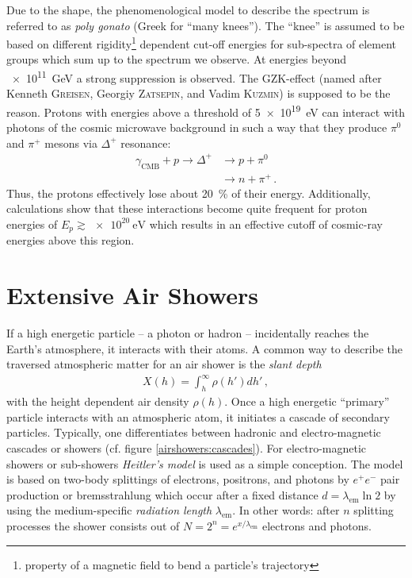 Due to the shape, the phenomenological model to describe the spectrum is referred to as \textit{poly gonato} (Greek for \enquote{many knees}). The \enquote{knee} is assumed to be based on different rigidity\footnote{property of a magnetic field to bend a particle's trajectory} dependent cut-off energies for sub-spectra of element groups which sum up to the spectrum we observe. \cite{cosmicrays:hoerandel, cosmicrays:shapiro} At energies beyond \SI{e11}{\giga\electronvolt} a strong suppression is observed. The GZK-effect (named after Kenneth \textsc{Greisen}, Georgiy \textsc{Zatsepin}, and Vadim \textsc{Kuzmin}) is supposed to be the reason. Protons with energies above a threshold of \SI{5e19}{\electronvolt} can interact with photons of the cosmic microwave background in such a way that they produce $\pi^0$ and $\pi^+$ mesons via $\Delta^+$ resonance:
\begin{subequations}
	\begin{align}
	\gamma_\text{CMB} + p \rightarrow \Delta^+ &\rightarrow p + \pi^0\\
	&\rightarrow n + \pi^+\,.
	\end{align}
\end{subequations}
Thus, the protons effectively lose about \SI{20}{\percent} of their energy. Additionally, calculations show that these interactions become quite frequent for proton energies of $E_p\gtrsim\SI{e20}{\electronvolt}$ which results in an effective cutoff of cosmic-ray energies above this region. \cite{cosmicrays:gzk}

\section{Extensive Air Showers}

If a high energetic particle -- a photon or hadron -- incidentally reaches the Earth's atmosphere, it interacts with their atoms. A common way to describe the traversed atmospheric matter for an air shower is the \textit{slant depth}
\begin{align}
X(h) = \int_{h}^{\infty}\rho(h')dh'\,,
\end{align}
with the height dependent air density $\rho(h)$. Once a high energetic \enquote{primary} particle interacts with an atmospheric atom, it initiates a cascade of secondary particles. Typically, one differentiates between hadronic and electro-magnetic cascades or showers (cf. figure \ref{airshowers:cascades}). For electro-magnetic showers or sub-showers \textit{Heitler's model} is used as a simple conception. The model is based on two-body splittings of electrons, positrons, and photons by $e^+ e^-$ pair production or bremsstrahlung which occur after a fixed distance $d=\lambda_\text{em}\ln{2}$ by using the medium-specific \textit{radiation length} $\lambda_\text{em}$. In other words: after $n$ splitting processes the shower consists out of $N = 2^n = e^{x/\lambda_\text{em}}$ electrons and photons.

